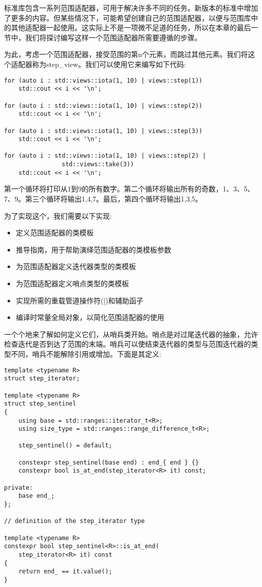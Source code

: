 标准库包含一系列范围适配器，可用于解决许多不同的任务。新版本的标准中增加了更多的内容。但某些情况下，可能希望创建自己的范围适配器，以便与范围库中的其他适配器一起使用。这实际上不是一项微不足道的任务，所以在本章的最后一节中，我们将探讨编写这样一个范围适配器所需要遵循的步骤。

为此，考虑一个范围适配器，接受范围的第n个元素，而跳过其他元素。我们将这个适配器称为step\_view。我们可以使用它来编写如下代码:

\begin{lstlisting}[style=styleCXX]
for (auto i : std::views::iota(1, 10) | views::step(1))
	std::cout << i << '\n';

for (auto i : std::views::iota(1, 10) | views::step(2))
	std::cout << i << '\n';

for (auto i : std::views::iota(1, 10) | views::step(3))
	std::cout << i << '\n';

for (auto i : std::views::iota(1, 10) | views::step(2) | 	
				std::views::take(3))
	std::cout << i << '\n';
\end{lstlisting}

第一个循环将打印从1到9的所有数字。第二个循环将输出所有的奇数，1、3、5、7、9。第三个循环将输出1,4,7。最后，第四个循环将输出1,3,5。

为了实现这个，我们需要以下实现:

\begin{itemize}
\item
定义范围适配器的类模板

\item
推导指南，用于帮助演绎范围适配器的类模板参数

\item
为范围适配器定义迭代器类型的类模板

\item
为范围适配器定义哨点类型的类模板

\item
实现所需的重载管道操作符(|)和辅助函子

\item
编译时常量全局对象，以简化范围适配器的使用
\end{itemize}

一个个地来了解如何定义它们，从哨兵类开始。哨点是对过尾迭代器的抽象，允许检查迭代是否到达了范围的末端。哨兵可以使结束迭代器的类型与范围迭代器的类型不同，哨兵不能解除引用或增加。下面是其定义:

\begin{lstlisting}[style=styleCXX]
template <typename R>
struct step_iterator;

template <typename R>
struct step_sentinel
{
	using base = std::ranges::iterator_t<R>;
	using size_type = std::ranges::range_difference_t<R>;
	
	step_sentinel() = default;
	
	constexpr step_sentinel(base end) : end_{ end } {}
	constexpr bool is_at_end(step_iterator<R> it) const;
	
private:
	base end_;
};

// definition of the step_iterator type

template <typename R>
constexpr bool step_sentinel<R>::is_at_end(
	step_iterator<R> it) const
{
	return end_ == it.value();
}
\end{lstlisting}

